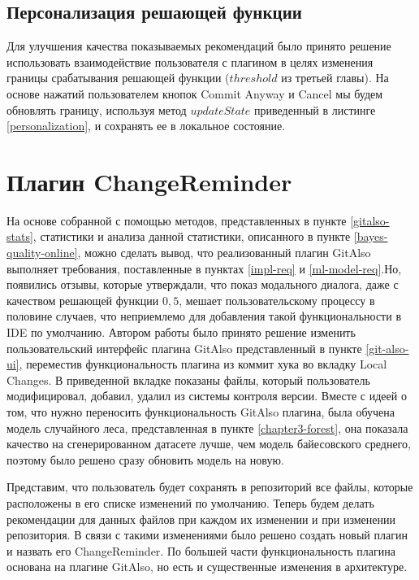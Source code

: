 \subsection{Персонализация решающей функции}
Для улучшения качества показываемых рекомендаций было принято решение использовать взаимодействие пользователя с плагином в целях изменения границы срабатывания решающей функции ($threshold$ из третьей главы). На основе нажатий пользователем кнопок Commit Anyway и Cancel мы будем обновлять границу, используя метод $updateState$ приведенный в листинге \ref{personalization}, и сохранять ее в локальное состояние.
\section{Плагин ChangeReminder}\label{changereminder-main}
На основе собранной с помощью методов, представленных в пункте \ref{gitalso-stats}, статистики и анализа данной статистики, описанного в пункте \ref{bayes-quality-online}, можно сделать вывод, что реализованный плагин GitAlso выполняет требования, поставленные в пунктах \ref{impl-req} и \ref{ml-model-req}.Но, появились отзывы, которые утверждали, что показ модального диалога, даже с качеством решающей функции $0,5$, мешает пользовательскому процессу в половине случаев, что неприемлемо для добавления такой функциональности в IDE по умолчанию. Автором работы было принято решение изменить пользовательский интерфейс плагина GitAlso представленный в пункте \ref{git-also-ui}, переместив функциональность плагина из коммит хука во вкладку Local Changes. В приведенной вкладке показаны файлы, который пользователь модифицировал, добавил, удалил из системы контроля версии. Вместе с идеей о том, что нужно переносить функциональность GitAlso плагина, была обучена модель случайного леса, представленная в пункте \ref{chapter3-forest}, она показала качество на сгенерированном датасете лучше, чем модель байесовского среднего, поэтому было решено сразу обновить модель на новую.

Представим, что пользователь будет сохранять в репозиторий все файлы, которые расположены в его списке изменений по умолчанию. Теперь будем делать рекомендации для данных файлов при каждом их изменении и при изменении репозитория. В связи с такими изменениями было решено создать новый плагин и назвать его ChangeReminder. По большей части функциональность плагина основана на плагине GitAlso, но есть и существенные изменения в архитектуре.
